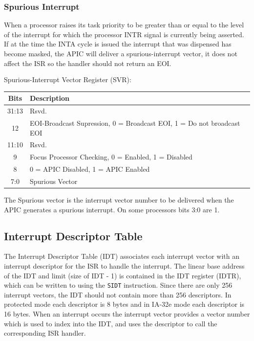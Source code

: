 \documentclass{article}
\newcommand{\layout}[1]{\parbox{\linewidth}{#1}}
\begin{document}
\layout{
  \subsubsection{Spurious Interrupt}

  When a processor raises its task priority to be greater than or equal to the level of the interrupt for which the processor INTR signal is currently being asserted. If at the time the INTA cycle is issued the interrupt that was dispensed has become masked, the APIC will deliver a spurious-interrupt vector, it does not affect the ISR so the handler should not return an EOI.

  \bigskip

  Spurious-Interrupt Vector Register (SVR):
  \begin{table}[H]
    \centering
    \begin{tabular}{|c|l|}
      \hline \textbf{Bits} & \textbf{Description} \\ \hline
      31:13 & Rsvd. \\
      12 & EOI-Broadcast Supression, 0 = Broadcast EOI, 1 = Do not broadcast EOI \\
      11:10 & Rsvd. \\
      9 & Focus Processor Checking, 0 = Enabled, 1 = Disabled \\
      8 & 0 = APIC Disabled, 1 = APIC Enabled \\
      7:0 & Spurious Vector \\ \hline
    \end{tabular}
  \end{table}

  The Spurious vector is the interrupt vector number to be delivered when the APIC generates a spurious interrupt.
  On some processors bits 3:0 are 1.

  \bigskip \cite[Chapter~12.9]{sdm3}
}

\layout{
  \subsection{Interrupt Descriptor Table}

  The Interrupt Descriptor Table (IDT) associates each interrupt vector with an interrupt descriptor for the ISR to handle the interrupt.
  The linear base address of the IDT and limit (size of IDT - 1) is contained in the IDT register (IDTR), which can be written to using the \texttt{SIDT} instruction.
  Since there are only 256 interrupt vectors, the IDT should not contain more than 256 descriptors.
  In protected mode each descriptor is 8 bytes and in IA-32e mode each descriptor is 16 bytes.
  When an interrupt occurs the interrupt vector provides a vector number which is used to index into the IDT, and uses the descriptor to call the corresponding ISR handler.

  \bigskip \cite[Chapter~7.10]{sdm3}
} \bigskip
\end{document}

